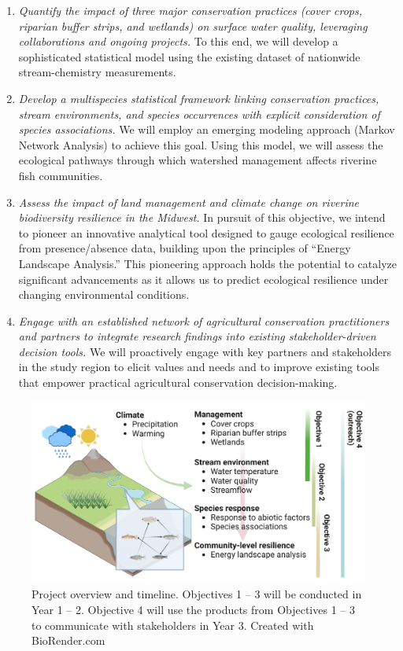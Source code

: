 \documentclass[12pt, class=article, crop=false]{standalone}
\begin{document}
\begin{enumerate}
    \item \textit{Quantify the impact of three major conservation practices (cover crops, riparian buffer strips, and wetlands) on surface water quality, leveraging collaborations and ongoing projects.} To this end, we will develop a sophisticated statistical model using the existing dataset of nationwide stream-chemistry measurements.

    \item \textit{Develop a multispecies statistical framework linking conservation practices, stream environments, and species occurrences with explicit consideration of species associations.} We will employ an emerging modeling approach (Markov Network Analysis) to achieve this goal. Using this model, we will assess the ecological pathways through which watershed management affects riverine fish communities.

    \item \textit{Assess the impact of land management and climate change on riverine biodiversity resilience in the Midwest.} In pursuit of this objective, we intend to pioneer an innovative analytical tool designed to gauge ecological resilience from presence/absence data, building upon the principles of ``Energy Landscape Analysis.'' This pioneering approach holds the potential to catalyze significant advancements as it allows us to predict ecological resilience under changing environmental conditions.
    
    \item \textit{Engage with an established network of agricultural conservation practitioners and partners to integrate research findings into existing stakeholder-driven decision tools.} We will proactively engage with key partners and stakeholders in the study region to elicit values and needs and to improve existing tools that empower practical agricultural conservation decision-making.
\end{enumerate}

\begin{figure}
\centering
\includegraphics[scale=0.65]{output/fig_overview.pdf}
\caption{Project overview and timeline.
Objectives 1 -- 3 will be conducted in Year 1 -- 2.
Objective 4 will use the products from Objectives 1 -- 3 to communicate with stakeholders in Year 3.
Created with BioRender.com}
\label{fig:overview}
\end{figure}
\end{document}
